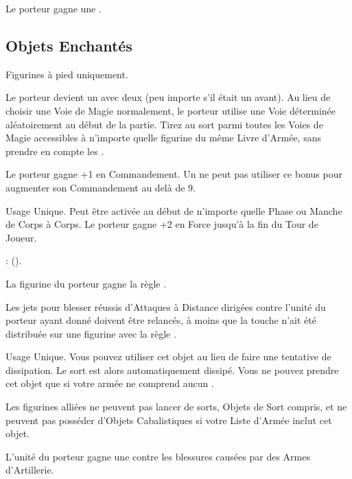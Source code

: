 Le porteur gagne une .

\endpricelist

\newpage
\hypertarget{enchanteditems}{\subsection{Objets Enchantés}}
\label{enchanted_items}

\startpricelist

Figurines à pied uniquement.

Le porteur devient un \wizardapprentice{} avec deux \learnedspells{} (peu importe s'il était un \wizard{} avant). Au lieu de choisir une Voie de Magie normalement, le porteur utilise une Voie déterminée aléatoirement au début de la partie. Tirez au sort parmi toutes les Voies de Magie accessibles à n'importe quelle figurine du même Livre d'Armée, sans prendre en compte les \boundspells{}.

Le porteur gagne +1 en Commandement. Un \wizard{} ne peut pas utiliser ce bonus pour augmenter son Commandement au delà de 9.

Usage Unique. Peut être activée au début de n'importe quelle Phase ou Manche de Corps à Corps. Le porteur gagne +2 en Force jusqu'à la fin du Tour de Joueur.

 : \pyromancyspellone{} (\pyromancy{}).

La figurine du porteur gagne la règle \divineattacks{}.

Les jets pour blesser réussis d'Attaques à Distance dirigées contre l'unité du porteur ayant donné  doivent être relancés, à moins que la touche n'ait été distribuée sur une figurine avec la règle \toweringpresence{}.

Usage Unique. Vous pouvez utiliser cet objet au lieu de faire une tentative de dissipation. Le sort est alors automatiquement dissipé. Vous ne pouvez prendre cet objet que si votre armée ne comprend aucun \wizard{}.

Les figurines alliées ne peuvent pas lancer de sorts, Objets de Sort compris, et ne peuvent pas posséder d'Objets Cabalistiques si votre Liste d'Armée inclut cet objet.

L'unité du porteur gagne une  contre les blessures causées par des Armes d'Artillerie.

